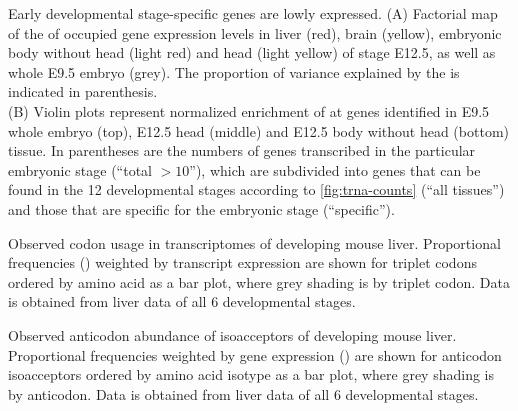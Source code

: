     {Early developmental stage-specific \trna genes are lowly expressed.}
    {(A) Factorial map of the \pca of  occupied \trna gene expression
    levels in liver (red), brain (yellow), embryonic body without head (light
    red) and head (light yellow) of stage E12.5, as well as whole E9.5 embryo
    (grey). The proportion of variance explained by the  is indicated
    in parenthesis.\\
    (B) Violin plots represent normalized enrichment of  at \trna genes
    identified in E9.5 whole embryo (top), E12.5 head (middle) and E12.5 body
    without head (bottom) tissue. In parentheses are the numbers of \trna genes
    transcribed in the particular embryonic stage (“total \(>10\)”), which are
    subdivided into \trna genes that can be found in the \num{12} developmental
    stages according to \cref{fig:trna-counts} (“all tissues”) and those that
    are specific for the embryonic stage (“specific”).}

    {Observed codon usage in \mrna transcriptomes of developing mouse liver.}
    {Proportional frequencies (\rcu) weighted by transcript expression are shown
    for triplet codons ordered by amino acid as a bar plot, where grey shading
    is by triplet codon. Data is obtained from liver \rnaseq data of all \num{6}
    developmental stages.}

    {Observed anticodon abundance of \trna isoacceptors of developing mouse
    liver.}
    {Proportional frequencies weighted by \trna gene expression (\raa) are shown
    for anticodon isoacceptors ordered by amino acid isotype as a bar plot,
    where grey shading is by anticodon. Data is obtained from liver 
    \chipseq data of all \num{6} developmental stages.}


